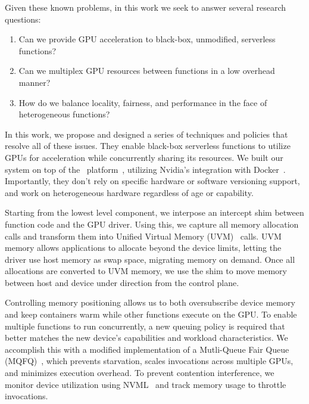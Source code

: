 Given these known problems, in this work we seek to answer several research questions:
\begin{enumerate}[leftmargin=*]
  \item Can we provide GPU acceleration to black-box, unmodified, serverless functions?
  \item Can we multiplex GPU resources between functions in a low overhead manner?
  \item How do we balance locality, fairness, and performance in the face of heterogeneous functions?
\end{enumerate}

In this work, we propose and designed a series of techniques and policies that resolve all of these issues.
They enable black-box serverless functions to utilize GPUs for acceleration while concurrently sharing its resources.
We built our system on top of the \sysname~platform~\cite{fuerst2023iluvatar}, utilizing Nvidia's integration with Docker~\cite{docker-main}. %
Importantly, they don't rely on specific hardware or software versioning support, and work on heterogeneous hardware regardless of age or capability. 

Starting from the lowest level component, we interpose an intercept shim between function code and the GPU driver.
Using this, we capture all memory allocation calls and transform them into Unified Virtual Memory (UVM)~\cite{nvidia-uvm} calls.
UVM memory allows applications to allocate beyond the device limits, letting the driver use host memory as swap space, migrating memory on demand. 
Once all allocations are converted to UVM memory, we use the shim to move memory between host and device under direction from the control plane.

Controlling memory positioning allows us to both oversubscribe device memory and keep containers warm while other functions execute on the GPU.
To enable multiple functions to run concurrently, a new queuing policy is required that better matches the new device's capabilities and workload characteristics.
We accomplish this with a modified implementation of a Mutli-Queue Fair Queue (MQFQ)~\cite{hedayati2019multi}, which prevents starvation, scales invocations across multiple GPUs, and minimizes execution overhead.
To prevent contention interference, we monitor device utilization using NVML~\cite{nvml} and track memory usage to throttle invocations.

